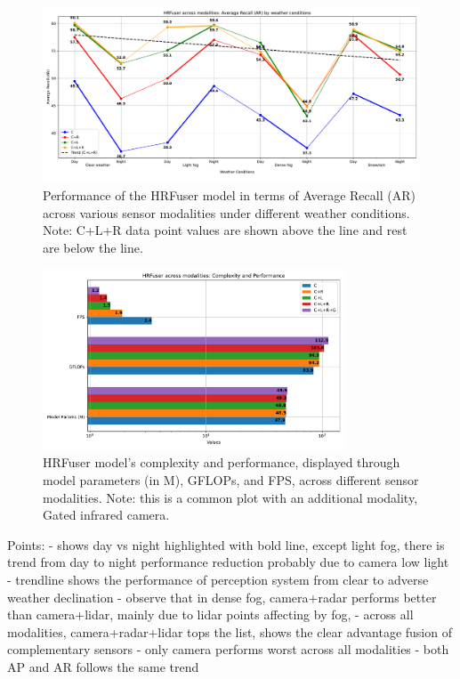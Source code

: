 \documentclass[report.tex]{subfiles}
\begin{document}
    \begin{figure}[]
        \centering
        \includegraphics[width=1.0\textwidth]{images/results/hrfuser/ar.pdf}
        \caption{Performance of the HRFuser model in terms of Average Recall (AR) across various sensor modalities under different weather conditions. Note: C+L+R data point values are shown above the line and rest are below the line.}
        \label{fig:hrfuser_ar}
    \end{figure}

    \begin{figure}[h!]
        \centering
        \includegraphics[width=0.8\textwidth]{images/results/hrfuser/model_complexity.pdf}
        \caption{HRFuser model's complexity and performance, displayed through model parameters (in M), GFLOPs, and FPS, across different sensor modalities. Note: this is a common plot with an additional modality, Gated infrared camera.}
        \label{fig:hrfuser_model_complexity}
    \end{figure}



    Points:
    - shows day vs night highlighted with bold line, except light fog, there is trend from day to night performance reduction probably due to camera low light
    - trendline shows the performance of perception system from clear to adverse weather declination
    - observe that in dense fog, camera+radar performs better than camera+lidar, mainly due to lidar points affecting by fog,  
    - across all modalities, camera+radar+lidar tops the list, shows the clear advantage fusion of complementary sensors 
    - only camera performs worst across all modalities
    - both AP and AR follows the same trend
\end{document}
